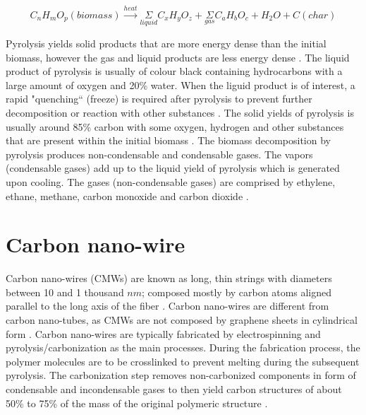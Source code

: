 \begin{equation}
C_{n} H_{m} O_{p} (biomass) \overset{heat}{\rightarrow} \underset{liquid}{\Sigma} C_{x} H_{y} O_{z} + \underset{gas}{\Sigma} C_{a} H_{b} O_{c} + H_{2} O + C (char)
\label{eq:genPyrolysis}
\end{equation}

Pyrolysis yields solid products that are more energy dense than the initial biomass, however the gas and liquid products are less energy dense \cite{Basu2018}. The liquid product of pyrolysis is usually of colour black containing hydrocarbons with a large amount of oxygen and 20\% water. When the liguid product is of interest, a rapid "quenching`` (freeze) is required after pyrolysis to prevent further decomposition or reaction with other substances \cite{Basu2018}. The solid yields of pyrolysis is usually around 85\% carbon with some oxygen, hydrogen and other substances that are present within the initial biomass \cite{Basu2018}. The biomass decomposition by pyrolysis produces non-condensable and condensable gases. The vapors (condensable gases) add up to the liquid yield of pyrolysis which is generated upon cooling. The gases (non-condensable gases) are comprised by ethylene, ethane, methane, carbon monoxide and carbon dioxide \cite{Basu2018}.

\section{Carbon nano-wire}
Carbon nano-wires (CMWs) are known as long, thin strings with diameters between 10 and 1 thousand $n m$; composed mostly by carbon atoms aligned parallel to the long axis of the fiber \cite{Nataraj2012}. Carbon nano-wires are different from carbon nano-tubes, as CMWs are not composed by graphene sheets in cylindrical form \cite{Nataraj2012}. Carbon nano-wires are typically fabricated by electrospinning and pyrolysis/carbonization as the main processes. During the fabrication process, the polymer molecules are to be crosslinked to prevent melting during the subsequent pyrolysis. The carbonization step removes non-carbonized components in form of condensable and incondensable gases \cite{Basu2018} to then yield carbon structures of about 50\% to 75\% of the mass of the original polymeric structure \cite{Nataraj2012}.






